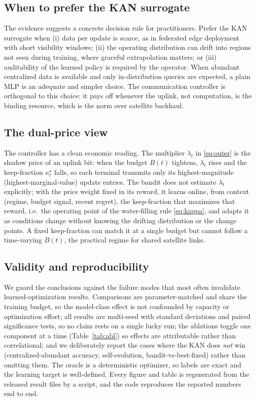 \documentclass[journal]{IEEEtran}
\begin{document}
\subsection{When to prefer the KAN surrogate}
The evidence suggests a concrete decision rule for practitioners. Prefer the KAN
surrogate when (i) data per update is scarce, as in federated edge deployment with
short visibility windows; (ii) the operating distribution can drift into regions
not seen during training, where graceful extrapolation matters; or (iii)
auditability of the learned policy is required by the operator. When abundant
centralized data is available and only in-distribution queries are expected, a
plain MLP is an adequate and simpler choice. The communication controller is
orthogonal to this choice: it pays off whenever the uplink, not computation, is the
binding resource, which is the norm over satellite backhaul.

\subsection{The dual-price view}
The controller has a clean economic reading. The multiplier $\lambda_t$ in
\eqref{eq:outer} is the shadow price of an uplink bit: when the budget $B(t)$
tightens, $\lambda_t$ rises and the keep-fraction $\kappa_t^\star$ falls, so each
terminal transmits only its highest-magnitude (highest-marginal-value) update
entries. The bandit does not estimate $\lambda_t$ explicitly; with the price weight
fixed in its reward, it learns online, from context (regime, budget signal, recent
regret), the keep-fraction that maximizes that reward, i.e.\ the operating point of
the water-filling rule \eqref{eq:kappa}, and adapts it as conditions change without
knowing the drifting distribution or the change points. A fixed keep-fraction can
match it at a single budget but cannot follow a time-varying $B(t)$, the practical
regime for shared satellite links.

\subsection{Validity and reproducibility}
We guard the conclusions against the failure modes that most often invalidate
learned-optimization results. Comparisons are parameter-matched and share the
training budget, so the model-class effect is not confounded by capacity or
optimization effort; all results are multi-seed with standard deviations and
paired significance tests, so no claim rests on a single lucky run; the ablations
toggle one component at a time (Table~\ref{tab:abl}) so effects are attributable
rather than correlational; and we deliberately report the cases where the KAN does
\emph{not} win (centralized-abundant accuracy, self-evolution, bandit-vs-best-fixed)
rather than omitting them. The oracle is a deterministic optimizer, so labels are
exact and the learning target is well-defined. Every figure and table is
regenerated from the released result files by a script, and the code reproduces the
reported numbers end to end.
\end{document}
